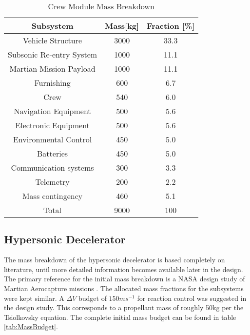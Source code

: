 \begin{table}[H]
	\caption{Crew Module Mass Breakdown}
	\begin{tabular}{|c|c|c|}
    \hline
    Subsystem        					& Mass[kg] 	& Fraction [\%] \\ \hline \hline
    Vehicle Structure 				& 3000			& 33.3 					\\ \hline 
		Subsonic Re-entry System	& 1000			& 11.1					\\ \hline
		Martian Mission Payload 	& 1000			& 11.1 					\\ \hline
		Furnishing								& 600				& 6.7 					\\ \hline
		Crew											& 540				& 6.0						\\ \hline
		Navigation Equipment			& 500				& 5.6						\\ \hline
		Electronic Equipment 			& 500				& 5.6						\\ \hline
		Environmental Control			& 450				& 5.0						\\ \hline
		Batteries									&	450				&	5.0						\\ \hline
		Communication systems			& 300				& 3.3						\\ \hline
		Telemetry									& 200				& 2.2						\\ \hline
		Mass contingency					&	460				& 5.1						\\ \hline
		Total											&	9000			& 100						\\ \hline
    \end{tabular}
    \label{tab:CVMB}
\end{table}

\subsection{Hypersonic Decelerator}
The mass breakdown of the hypersonic decelerator is based completely on literature, until more detailed information becomes available later in the design. The primary reference for the initial mass breakdown is a NASA design study of Martian Aerocapture missions \cite{Cianciolo2010}. The allocated mass fractions for the subsystems were kept similar. A $\Delta V$ budget of $150 ms^{-1}$ for reaction control was suggested in the design study. This corresponds to a propellant mass of roughly 50kg per the Tsiolkovsky equation. The complete initial mass budget can be found in table \ref{tab:MassBudget}. 

